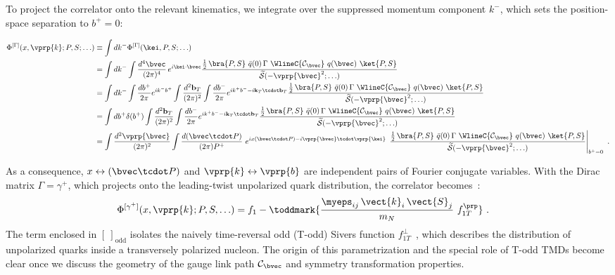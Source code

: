 To project the correlator onto the relevant kinematics, we integrate over the suppressed momentum component $k^-$, which sets the position-space separation to $b^+ = 0$:
\begin{widetext}
\begin{align}
	\Phi^{[\Gamma]}(x,\vprp{k};P,S;\ldots) & \equiv \int dk^{-} \Phi^{[\Gamma]}(\kei,P,S;\ldots) \nonumber \\ 
 &=\int dk^{-}\int \frac{d^4 \bvec}{(2\pi)^4}\, e^{i \kei\cdot \bvec} \frac{\frac{1}{2}\, \bra{P,S}\ \bar{q}(0)\, \Gamma\ \WlineC{\mathcal{C}_\bvec}\ q(\bvec)\ \ket{P,S}}{ \widetilde{\mathcal{S}}(-\vprp{\bvec}^2;\ldots) }\\
 &=\int dk^{-}\int \frac{db^{+}}{2\pi}e^{ik^-b^+}\int \frac{d^2\textbf{b}_T}{(2\pi)^2}\int \frac{db^-}{2\pi}e^{ik^+b^--i\textbf{k}_T\tcdot\textbf{b}_T}\frac{\frac{1}{2}\, \bra{P,S}\ \bar{q}(0)\, \Gamma\ \WlineC{\mathcal{C}_\bvec}\ q(\bvec)\ \ket{P,S}}{ \widetilde{\mathcal{S}}(-\vprp{\bvec}^2;\ldots) }\\
 &=\int {db^{+}}\delta(b^+)\int \frac{d^2\textbf{b}_T}{(2\pi)^2}\int \frac{db^-}{2\pi}e^{ik^+b^--i\textbf{k}_T\tcdot\textbf{b}_T}\frac{\frac{1}{2}\, \bra{P,S}\ \bar{q}(0)\, \Gamma\ \WlineC{\mathcal{C}_\bvec}\ q(\bvec)\ \ket{P,S}}{ \widetilde{\mathcal{S}}(-\vprp{\bvec}^2;\ldots) }\\
	& =\int \frac{d^2 \vprp{\bvec}}{(2\pi)^2} \int \frac{d (\bvec \tcdot P)}{(2\pi) P^+}\ e^{i x (\bvec \tcdot P) - i\vprp{\bvec} \tcdot \vprp{\kei}}\,
		\left. \frac{\frac{1}{2}\, \bra{P,S}\ \bar{q}(0)\, \Gamma\ \WlineC{\mathcal{C}_\bvec}\ q(\bvec)\ \ket{P,S}}
		{ \widetilde{\mathcal{S}}(-\vprp{\bvec}^2;\ldots) } \right|_{b^+ = 0} \ .
\end{align}
\end{widetext}
As a consequence, $x \leftrightarrow (\bvec \tcdot P)$ and $\vprp{k} \leftrightarrow \vprp{b}$ are independent pairs of Fourier conjugate variables.
With the Dirac matrix $\Gamma = \gamma^+$, which projects onto the leading-twist unpolarized quark distribution, the correlator becomes~\cite{Ralston:1979ys, Tangerman:1994eh,Mulders:1995dh,Goeke:2005hb}:
\begin{align}
	\Phi^{[\gamma^+]}(x,\vprp{k};P,S,\ldots) & = f_1 - \toddmark{\frac{\myeps_{ij}\, \vect{k}_{i}\, \vect{S}_{j}}{m_N}\ f_{1T}^\prp} \label{eq-phigammaplus}\ . 
\end{align}
The term enclosed in $[\ ]_\text{odd}$ isolates the naively time-reversal odd (T-odd) Sivers function $f_{1T}^\perp$~\cite{Sivers:1989cc}, which describes the distribution of unpolarized quarks inside a transversely polarized nucleon. The origin of this parametrization and the special role of T-odd TMDs become clear once we discuss the geometry of the gauge link path $\mathcal{C}_\bvec $ and symmetry transformation properties.
